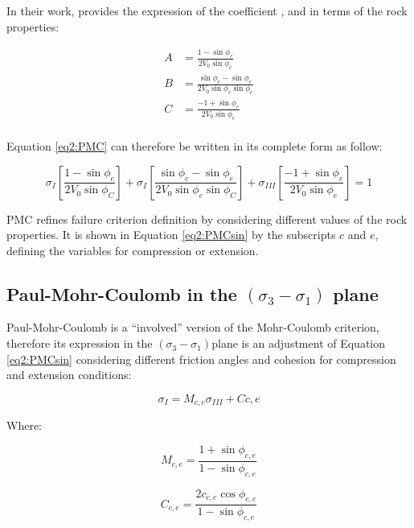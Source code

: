 In their work, \cite[Meyer and Labuz (2013)]{Meyer2013} provides the expression of the coefficient ,  and  in terms of the rock properties:

\begin{align}
    A &= \frac{1-\sin \phi_c}{2V_0\sin \phi_c} \\
    B &= \frac{\sin \phi_c - \sin \phi_e}{2V_0 \sin \phi_e \sin \phi_c} \\
    C &= \frac{-1+\sin \phi_e}{2V_0\sin \phi_e} \\
\end{align}

Equation \ref{eq2:PMC} can therefore be written in its complete form as follow:

\begin{equation}\label{eq2:PMCsin}
    \sigma_{I}\left[\frac{1-\sin \phi_{c}}{2 V_{0} \sin \phi_{C}}\right]+\sigma_{I}\left[\frac{\sin \phi_{c}-\sin \phi_{e}}{2 V_{0} \sin \phi_{e} \sin \phi_{C}}\right]+\sigma_{I I I}\left[\frac{-1+\sin \phi_{e}}{2 V_{0} \sin \phi_{e}}\right]=1
\end{equation}

PMC refines failure criterion definition by considering different values of the rock properties.  It is shown in Equation \ref{eq2:PMCsin} by the subscripts $c$ and $e$, defining the variables for compression or extension.

\subsection{Paul-Mohr-Coulomb in the \texorpdfstring{$(\sigma_3 -\sigma_1)$}{sigma 3 - sigma 1} plane}\label{ch2:PMCsig1sig3}

Paul-Mohr-Coulomb is a “involved” version of the Mohr-Coulomb criterion, therefore its expression in the  $(\sigma_3 -\sigma_1)$plane is an adjustment of Equation \ref{eq2:PMCsin} considering different friction angles and cohesion for compression and extension conditions: 

\begin{equation}
    \sigma_I = M_{c,e}\sigma_{III}+C{c,e}
\end{equation}

Where:

\begin{equation}
    M_{c,e} = \frac{1+\sin \phi_{c,e}}{1-\sin \phi_{c,e}}
\end{equation}

\begin{equation}
    C_{c,e} = \frac{2c_{c,e}\cos \phi_{c,e}}{1-\sin \phi_{c,e}}
\end{equation}


